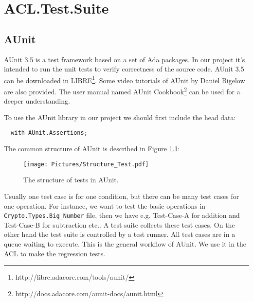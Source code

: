 \chapter{ACL.Test.Suite}
\section{AUnit}
AUnit 3.5 is a test framework based on a set of Ada packages. In our
project it's intended to run the unit tests to verify correctness of
the source code. AUnit 3.5 can be downloaded in
LIBRE\footnote{http://libre.adacore.com/tools/aunit/}. Some video
tutorials of AUnit by Daniel Bigelow are also provided. The user
manual named AUnit
Cookbook\footnote{http://docs.adacore.com/aunit-docs/aunit.html} can
be used for a deeper understanding.

To use the AUnit library in our project we should first include the head data:
\begin{lstlisting}
  with AUnit.Assertions;
\end{lstlisting}

The common structure of AUnit is described in Figure \ref{TestAunit}:
\begin{figure}[htp]
  \centering
  \texttt{[image: Pictures/Structure\_Test.pdf]}
  \caption{The structure of tests in AUnit.}\label{TestAunit}
\end{figure}

Usually one test case is for one condition, but there can be many test
cases for one operation. For instance, we want to test the basic
operations in \texttt{Crypto.Types.Big\_Number} file, then we have
e.g. Test-Case-A for addition and Test-Case-B for subtraction etc.. A
test suite collects these test cases. On the other hand the test suite
is controlled by a test runner. All test cases are in a queue waiting
to execute. This is the general workflow of AUnit. We use it in the
ACL to make the regression tests.

